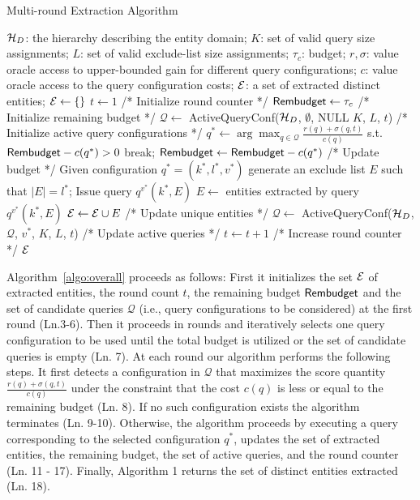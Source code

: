 \begin{algorithm}[h]
\footnotesize\caption{Multi-round Extraction Algorithm}
\label{algo:overall}
\begin{algorithmic}[1]
 $\mathcal{H}_D$: the hierarchy describing the entity domain; $K$: set of valid query size assignments; $L$: set of valid exclude-list size assignments; $\tau_c$: budget; $r,\sigma$: value oracle access to upper-bounded gain for different query configurations; $c$: value oracle access to the query configuration costs;
 $\mathcal{E}$: a set of extracted distinct entities;
\STATE $\mathcal{E} \leftarrow \{\}$
\STATE $t \leftarrow 1$ /* Initialize round counter */
\STATE ${\sf Rembudget} \leftarrow \tau_c$ /* Initialize remaining budget */
\STATE $\mathcal{Q} \leftarrow$ {\sf ActiveQueryConf($\mathcal{H}_D$, $\emptyset$, NULL $K$, $L$, $t$)} /* Initialize active query configurations */
	\STATE $q^* \leftarrow \arg\max_{q \in {\mathcal{Q}}} \frac{r(q)+\sigma(q,t)}{c(q)}$ s.t. ${\sf Rembudget} - c(q^*) >0$
		\STATE break;
	\ENDIF
	\STATE ${\sf Rembudget} \leftarrow {\sf Rembudget} - c(q^*)$ /* Update budget */
	\STATE Given configuration $q^* = (k^*,l^*,v^*)$ generate an exclude list $E$ such that $|E| = l^*$; 
	\STATE Issue query $q^{v^{*}}(k^*,E)$
	\STATE $E \leftarrow$ entities extracted by query $q^{v^{*}}(k^*,E)$
	\STATE $\mathcal{E} \leftarrow \mathcal{E} \cup E$ /* Update unique entities */
	\STATE $\mathcal{Q} \leftarrow$ {\sf ActiveQueryConf($\mathcal{H}_D$, $\mathcal{Q}$, $v^*$, $K$, $L$, $t$)} /* Update active queries */
	\STATE $t \leftarrow t + 1$ /* Increase round counter */
\ENDWHILE
\RETURN $\mathcal{E}$
\end{algorithmic}
\end{algorithm}

Algorithm~\ref{algo:overall} proceeds as follows: First it initializes the set $\mathcal{E}$ of extracted entities, the round count $t$, the remaining budget ${\sf Rembudget}$ and the set of candidate queries $\mathcal{Q}$ (i.e., query configurations to be considered) at the first round (Ln.3-6). Then it proceeds in rounds and iteratively selects one query configuration to be used until the total budget is utilized or the set of candidate queries is empty (Ln. 7). At each round our algorithm performs the following steps. It first detects a configuration in $\mathcal{Q}$ that maximizes the score quantity $\frac{r(q) + \sigma(q,t)}{c(q)}$ under the constraint that the cost $c(q)$ is less or equal to the remaining budget (Ln. 8). If no such configuration exists the algorithm terminates (Ln. 9-10). Otherwise, the algorithm proceeds by executing a query corresponding to the selected configuration $q^*$, updates the set of extracted entities, the remaining budget, the set of active queries, and the round counter (Ln. 11 - 17). Finally, Algorithm 1 returns the set of distinct entities extracted (Ln. 18). 

